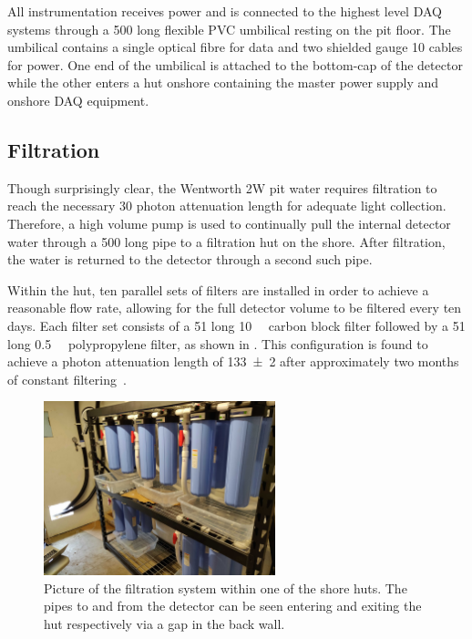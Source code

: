 All \chipsfive instrumentation receives power and is connected to the highest level DAQ systems
through a \SI{500}{} long flexible PVC umbilical resting on the pit floor. The umbilical
contains a single optical fibre for data and two shielded gauge 10 cables for power. One end of
the umbilical is attached to the bottom-cap of the detector while the other enters a hut onshore
containing the master power supply and onshore DAQ equipment.

\subsection{Filtration} %
\label{sec:chips_detector_water} %

Though surprisingly clear, the Wentworth 2W pit water requires filtration to reach the necessary
\SI{30}{} photon attenuation length for adequate light collection. Therefore, a high
volume pump is used to continually pull the internal detector water through a \SI{500}{}
long pipe to a filtration hut on the shore. After filtration, the water is returned to the
detector through a second such pipe.

Within the hut, ten parallel sets of filters are installed in order to achieve a reasonable flow
rate, allowing for the full detector volume to be filtered every ten days. Each filter set
consists of a \SI{51}{} long \SI{10}{\micro{}} carbon block filter followed by a
\SI{51}{} long \SI{0.5}{\micro{}} polypropylene filter, as shown in
. This configuration is found to achieve a photon attenuation length of
\SI{133\pm2}{} after approximately two months of constant filtering~\cite{campbell2020}.

\begin{figure} %
    \includegraphics[width=0.6\textwidth]{diagrams/4-chips/filtration.pdf}
    \caption[Picture of the \chipsfive filtration system]
    {Picture of the \chipsfive filtration system within one of the shore huts. The pipes to and
        from the detector can be seen entering and exiting the hut respectively via a gap in the
        back wall.}
    \label{fig:filtration}
\end{figure}

